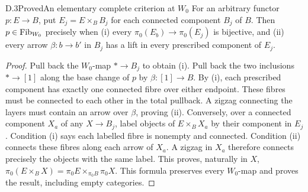 \begin{claim}{D.3}{Proved}{An elementary complete criterion at $W_0$}
For an arbitrary functor $p:E\to B$, put $E_j=E\times_BB_j$ for each connected component $B_j$ of $B$. Then $p\in\mathrm{Fib}_{W_0}$ precisely when (i) every $\pi_0(E_b)\to\pi_0(E_j)$ is bijective, and (ii) every arrow $\beta:b\to b'$ in $B_j$ has a lift in every prescribed component of $E_j$.
\end{claim}
\begin{proof}
Pull back the $W_0$-map $*\to B_j$ to obtain (i). Pull back the two inclusions $*\to[1]$ along the base change of $p$ by $\beta:[1]\to B$. By (i), each prescribed component has exactly one connected fibre over either endpoint. These fibres must be connected to each other in the total pullback. A zigzag connecting the layers must contain an arrow over $\beta$, proving (ii). Conversely, over a connected component $X_a$ of any $X\to B_j$, label objects of $E\times_BX_a$ by their component in $E_j$. Condition (i) says each labelled fibre is nonempty and connected. Condition (ii) connects these fibres along each arrow of $X_a$. A zigzag in $X_a$ therefore connects precisely the objects with the same label. This proves, naturally in $X$,
$\pi_0(E\times_BX)=\pi_0E\times_{\pi_0B}\pi_0X$.
This formula preserves every $W_0$-map and proves the result, including empty categories.
\end{proof}

